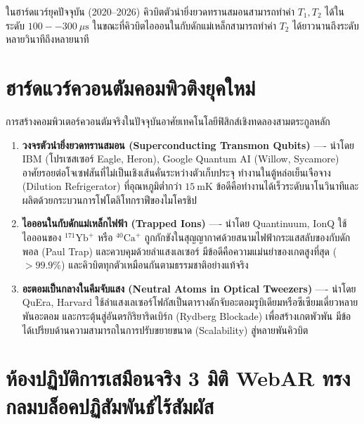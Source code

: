 ในฮาร์ดแวร์ยุคปัจจุบัน (2020--2026) คิวบิตตัวนำยิ่งยวดทรานสมอนสามารถทำค่า $T_1, T_2$ ได้ในระดับ $100--300~\mu\text{s}$ ในขณะที่คิวบิตไอออนในกับดักแม่เหล็กสามารถทำค่า $T_2$ ได้ยาวนานถึงระดับหลายวินาทีถึงหลายนาที

\section{ฮาร์ดแวร์ควอนตัมคอมพิวติงยุคใหม่}

การสร้างคอมพิวเตอร์ควอนตัมจริงในปัจจุบันอาศัยเทคโนโลยีฟิสิกส์เชิงทดลองสามตระกูลหลัก
\begin{enumerate}
    \item \textbf{วงจรตัวนำยิ่งยวดทรานสมอน (Superconducting Transmon Qubits)} ---- นำโดย IBM (โปรเซสเซอร์ Eagle, Heron), Google Quantum AI (Willow, Sycamore) อาศัยรอยต่อโจเซฟสันที่ไม่เป็นเชิงเส้นคั่นระหว่างตัวเก็บประจุ ทำงานในตู้หล่อเย็นเจือจาง (Dilution Refrigerator) ที่อุณหภูมิต่ำกว่า $15~\text{mK}$ ข้อดีคือทำงานได้เร็วระดับนาโนวินาทีและผลิตด้วยกระบวนการโฟโตลิโทกราฟีของไมโครชิป
    \item \textbf{ไอออนในกับดักแม่เหล็กไฟฟ้า (Trapped Ions)} ---- นำโดย Quantinuum, IonQ ใช้ไอออนของ $^{171}\text{Yb}^+$ หรือ $^{40}\text{Ca}^+$ ถูกกักขังในสุญญากาศด้วยสนามไฟฟ้ากระแสสลับของกับดักพอล (Paul Trap) และควบคุมด้วยลำแสงเลเซอร์ มีข้อดีคือความแม่นยำของเกตสูงที่สุด ($> 99.9\%$) และคิวบิตทุกตัวเหมือนกันตามธรรมชาติอย่างแท้จริง
    \item \textbf{อะตอมเป็นกลางในคีมจับแสง (Neutral Atoms in Optical Tweezers)} ---- นำโดย QuEra, Harvard ใช้ลำแสงเลเซอร์โฟกัสเป็นตารางดักจับอะตอมรูบิเดียมหรือซีเซียมเดี่ยวหลายพันอะตอม และกระตุ้นสู่อันตรกิริยาริดเบิร์ก (Rydberg Blockade) เพื่อสร้างเกตพัวพัน มีข้อได้เปรียบด้านความสามารถในการปรับขยายขนาด (Scalability) สู่หลายพันคิวบิต
\end{enumerate}

\section{ห้องปฏิบัติการเสมือนจริง 3 มิติ WebAR ทรงกลมบล็อคปฏิสัมพันธ์ไร้สัมผัส}

